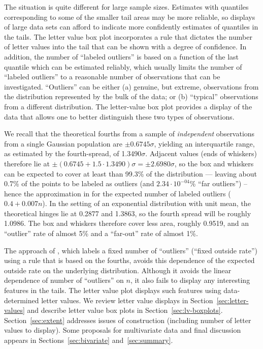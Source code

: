 \documentclass[oneside]{article}
\begin{document}
The situation is quite different for large sample sizes. Estimates with
quantiles corresponding to some of the smaller tail areas may be more
reliable, so displays of large data sets can afford to indicate more
confidently estimates of quantiles in the tails. The letter value box plot
incorporates a rule that dictates the number of letter values into the tail
that can be shown with a degree of confidence. In addition, the number of
``labeled outliers'' is based on a function of the last quantile which can be
estimated reliably, which usually limits the number of ``labeled outliers'' to
a reasonable number of observations that can be investigated. ``Outliers'' can
be either (a) genuine, but extreme, observations from the distribution
represented by the bulk of the data; or (b) ``typical'' observations from a
different distribution. The letter-value box plot provides a display of the
data that allows one to better distinguish these two types of observations.

We recall that the theoretical fourths from a sample of \textit{independent}
observations from a single Gaussian population are $\pm 0.6745\sigma$,
yielding an interquartile range, as estimated by the fourth-spread, of
1.3490$\sigma$. Adjacent values (ends of whiskers) therefore lie at $\pm
(0.6745 + 1.5 \cdot 1.3490)\sigma = \pm 2.6980\sigma$, so the box and whiskers
can be expected to cover at least than 99.3\% of the distribution --- leaving
about 0.7\% of the points to be labeled as outliers (and $2.34 \cdot
10^{-04}$\% ``far outliers'') -- hence the approximation in \citet[pg.
34]{dchlv} for the expected number of labeled outliers ($0.4 + 0.007n$). In
the setting of an exponential distribution with unit mean, the theoretical
hinges lie at 0.2877 and 1.3863, so the fourth spread will be roughly 1.0986.
The box and whiskers therefore cover less area, roughly 0.9519, and an
``outlier'' rate of almost 5\% and a ``far-out'' rate of almost 1\%.

The approach of \citet{dchbi}, which labels a fixed number of ``outliers'' (``fixed outside rate'') using a rule that is based on the fourths, avoids this dependence of the expected outside rate on the underlying distribution. Although it avoids the linear dependence of number of ``outliers'' on $n$, it also fails to display any interesting features in the tails. The letter value plot displays such features using data-determined letter values. We review letter value displays in Section~\ref{sec:letter-values} and describe letter value box plots in Section~\ref{sec:lv-boxplots}. Section~\ref{sec:extent} addresses issues of construction (including number of letter values to display). Some proposals for multivariate data and final discussion appears in Sections~\ref{sec:bivariate} and~\ref{sec:summary}.
\end{document}

